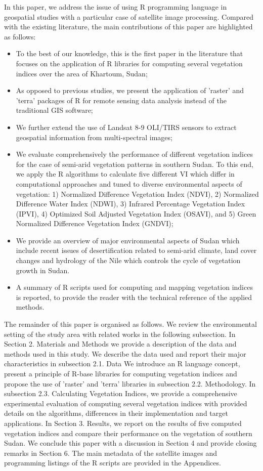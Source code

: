 \documentclass[jimaging,article,submit,pdftex,moreauthors]{Definitions/mdpi}
\begin{document}
In this paper, we address the issue of using R programming language in geospatial studies with a particular case of satellite image processing. Compared with the existing literature, the main contributions of this paper are highlighted as follows:
\begin{itemize}
	\item To the best of our knowledge, this is the first paper in the literature that focuses on the application of R libraries for computing several vegetation indices over the area of Khartoum, Sudan;
	\item As opposed to previous studies, we present the application of 'raster' and 'terra' packages of R for remote sensing data analysis instead of the traditional GIS software;
	\item We further extend the use of Landsat 8-9 OLI/TIRS sensors to extract geospatial information from multi-spectral images;
	\item We evaluate comprehensively the performance of different vegetation indices for the case of semi-arid vegetation patterns in southern Sudan. To this end, we apply the R algorithms to calculate five different VI which differ in computational approaches and tuned to diverse environmental aspects of vegetation: 1) Normalized Difference Vegetation Index (NDVI), 2) Normalized Difference Water Index (NDWI), 3) Infrared Percentage Vegetation Index (IPVI), 4) Optimized Soil Adjusted Vegetation Index (OSAVI), and 5) Green Normalized Difference Vegetation Index (GNDVI);
	\item We provide an overview of major environmental aspects of Sudan which include recent issues of desertification related to semi-arid climate, land cover changes and hydrology of the Nile which controls the cycle of vegetation growth in Sudan.
	\item A summary of R scripts used for computing and mapping vegetation indices is reported, to provide the reader with the technical reference of the applied methods.
\end{itemize}

The remainder of this paper is organised as follows. We review the environmental setting of the study area with related works in the following subsection. In Section 2. Materials and Methods we provide a description of the data and methods used in this study. We describe the data used and report their major characteristics in subsection 2.1. Data We introduce an R language concept, present a principle of R-base libraries for computing vegetation indices and propose the use of 'raster' and 'terra' libraries in subsection 2.2. Methodology. In subsection 2.3. Calculating Vegetation Indices, we provide a comprehensive experimental evaluation of computing several vegetation indices with provided details on the algorithms,  differences in their implementation and target applications. In Section 3. Results, we report on the results of five computed vegetation indices and compare their performance on the vegetation of southern Sudan. We conclude this paper with a discussion in Section 4 and provide closing remarks in Section 6. The main metadata of the satellite images and programming listings of the R scripts are provided in the Appendices.
\end{document}
